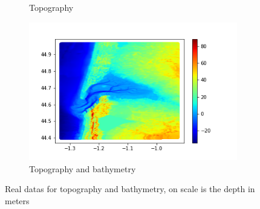 \begin{figure}[h]
\begin{subfigure}{0.5\textwidth}
        \caption{Topography}
        \label{fig:sub2}
    \end{subfigure}%
    \hspace*{-2.7cm}
    \begin{subfigure}{0.5\textwidth}
        \centering
        \includegraphics[scale=0.5]{images/Mesh/Topo_Mar_data.png}
        \caption{Topography and bathymetry}
        \label{fig:sub3}
    \end{subfigure}%
    \caption{Real datas for topography and bathymetry, on scale is the depth in meters}
    \label{fig:test}
    \end{figure}

\vspace{-0.75cm}
